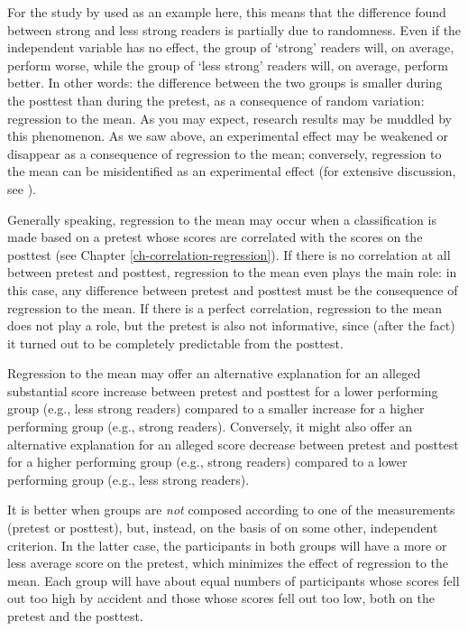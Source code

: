 \documentclass[
]{book}
\begin{document}
For the study by \citet{Dona83} used as an example here, this means that the difference found between strong and less strong readers is partially due to randomness. Even if the independent variable has no effect, the group of `strong' readers will, on average, perform worse, while the group of `less strong' readers will, on average, perform better. In other words: the difference between the two groups is smaller during the posttest than during the pretest, as a consequence of random variation: regression to the mean. As you may expect, research results may be muddled by this phenomenon. As we saw above, an experimental effect may be weakened or disappear as a consequence of regression to the mean; conversely, regression to the mean can be misidentified as an experimental effect (for extensive discussion, see \citet{RMP18}).

Generally speaking, regression to the mean may occur when a classification is made based on a pretest whose scores are correlated with the scores on the posttest (see Chapter \ref{ch-correlation-regression}). If there is no correlation at all between pretest and posttest, regression to the mean even plays the main role: in this case, any difference between pretest and posttest must be the consequence of regression to the mean. If there is a perfect correlation, regression to the mean does not play a role, but the pretest is also not informative, since (after the fact) it turned out to be completely predictable from the posttest.

Regression to the mean may offer an alternative explanation for an alleged substantial score increase between pretest and posttest for a lower performing group (e.g., less strong readers) compared to a smaller increase for a higher performing group (e.g., strong readers). Conversely, it might also offer an alternative explanation for an alleged score decrease between pretest and posttest for a higher performing group (e.g., strong readers) compared to a lower performing group (e.g., less strong readers).

It is better when groups are \emph{not} composed according to one of the measurements (pretest or posttest), but, instead, on the basis of on some other, independent criterion. In the latter case, the participants in both groups will have a more or less average score on the pretest, which minimizes the effect of regression to the mean. Each group will have about equal numbers of participants whose scores fell out too high by accident and those whose scores fell out too low, both on the pretest and the posttest.
\end{document}
